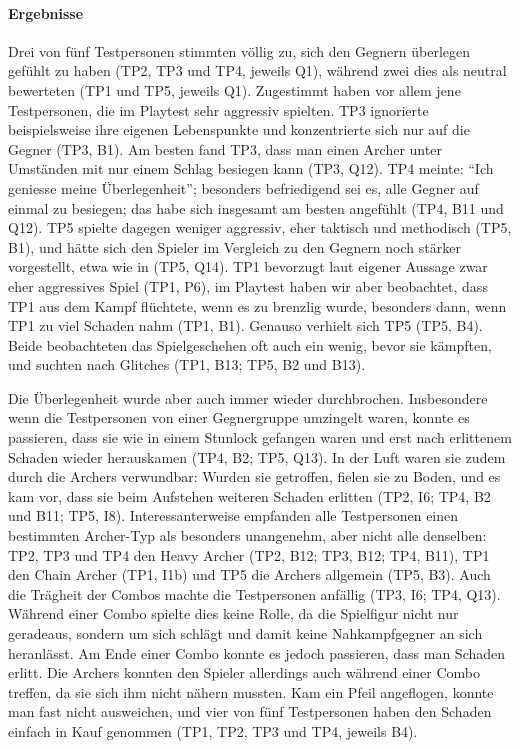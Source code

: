 \documentclass[../Main.tex]{subfiles}
\begin{document}
\paragraph{Ergebnisse}
Drei von fünf Testpersonen stimmten völlig zu, sich den Gegnern überlegen gefühlt zu haben (TP2, TP3 und TP4, jeweils Q1), während zwei dies als neutral bewerteten (TP1 und TP5, jeweils Q1). Zugestimmt haben vor allem jene Testpersonen, die im Playtest sehr aggressiv spielten. TP3 ignorierte beispielsweise ihre eigenen Lebenspunkte und konzentrierte sich nur auf die Gegner (TP3, B1). Am besten fand TP3, dass man einen Archer unter Umständen mit nur einem Schlag besiegen kann (TP3, Q12). TP4 meinte: \enquote{Ich geniesse meine Überlegenheit}; besonders befriedigend sei es, alle Gegner auf einmal zu besiegen; das habe sich insgesamt am besten angefühlt (TP4, B11 und Q12). TP5 spielte dagegen weniger aggressiv, eher taktisch und methodisch (TP5, B1), und hätte sich den Spieler im Vergleich zu den Gegnern noch stärker vorgestellt, etwa wie in  (TP5, Q14). TP1 bevorzugt laut eigener Aussage zwar eher aggressives Spiel (TP1, P6), im Playtest haben wir aber beobachtet, dass TP1 aus dem Kampf flüchtete, wenn es zu brenzlig wurde, besonders dann, wenn TP1 zu viel Schaden nahm (TP1, B1). Genauso verhielt sich TP5 (TP5, B4). Beide beobachteten das Spielgeschehen oft auch ein wenig, bevor sie kämpften, und suchten nach Glitches (TP1, B13; TP5, B2 und B13).

Die Überlegenheit wurde aber auch immer wieder durchbrochen. Insbesondere wenn die Testpersonen von einer Gegnergruppe umzingelt waren, konnte es passieren, dass sie wie in einem Stunlock gefangen waren und erst nach erlittenem Schaden wieder herauskamen (TP4, B2; TP5, Q13). In der Luft waren sie zudem durch die Archers verwundbar: Wurden sie getroffen, fielen sie zu Boden, und es kam vor, dass sie beim Aufstehen weiteren Schaden erlitten (TP2, I6; TP4, B2 und B11; TP5, I8). Interessanterweise empfanden alle Testpersonen einen bestimmten Archer-Typ als besonders unangenehm, aber nicht alle denselben: TP2, TP3 und TP4 den Heavy Archer (TP2, B12; TP3, B12; TP4, B11), TP1 den Chain Archer (TP1, I1b) und TP5 die Archers allgemein (TP5, B3). Auch die Trägheit der Combos machte die Testpersonen anfällig (TP3, I6; TP4, Q13). Während einer Combo spielte dies keine Rolle, da die Spielfigur nicht nur geradeaus, sondern um sich schlägt und damit keine Nahkampfgegner an sich heranlässt. Am Ende einer Combo konnte es jedoch passieren, dass man Schaden erlitt. Die Archers konnten den Spieler allerdings auch während einer Combo treffen, da sie sich ihm nicht nähern mussten. Kam ein Pfeil angeflogen, konnte man fast nicht ausweichen, und vier von fünf Testpersonen haben den Schaden einfach in Kauf genommen (TP1, TP2, TP3 und TP4, jeweils B4).
\end{document}
